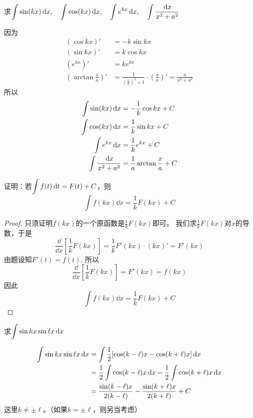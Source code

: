 \begin{example}
求$\displaystyle\int \sin (kx)\,{\rm d} x,\quad \displaystyle\int \cos(kx)\,{\rm d} x,\quad \displaystyle\int e^{kx}\,{\rm d} x,\quad \displaystyle\int \dfrac{\,{\rm d} x}{x^2+a^2}$
\end{example}

\begin{solution}
    因为
\[\begin{split}
    (\cos kx)'&=-k\sin kx\\
    (\sin kx)'&=k\cos kx\\
    (e^{kx})'&=ke^{kx}\\
    \left(\arctan\frac{x}{a}\right)'&=\frac{1}{\left(\frac{x}{a}\right)^2+1}\cdot\left(\frac{x}{a}\right)'=\frac{a}{x^2+a^2}
\end{split}\]
所以
\[\begin{split}
    \int \sin (kx)\,{\rm d} x&=-\dfrac{1}{k}\cos kx+C\\
    \displaystyle\int \cos(kx)\,{\rm d} x&=\dfrac{1}{k}\sin kx+C\\
    \displaystyle\int e^{kx}\,{\rm d} x&= \dfrac{1}{k}e^{kx}+C\\
    \displaystyle\int \dfrac{\,{\rm d} x}{x^2+a^2}&=\dfrac{1}{a}\arctan\dfrac{x}{a}+C \\
\end{split}  \]
\end{solution}

\begin{example}
    证明：若$\displaystyle\int f(t)\,{\rm d} t=F(t)+C$，则
\[\int f(kx)\dd x=\frac{1}{k}F(kx)+C\]
\end{example}

\begin{proof}
只须证明$f(kx)$的一个原函数是$\frac{1}{k}F(kx)$即可。
我们求$\frac{1}{k}F(kx)$对$x$的导数，于是
\[\frac{\dd}{\dd x}\left[\frac{1}{k}F(kx)\right]=\frac{1}{k}F'(kx)\cdot (kx)'=F'(kx)\]
由题设知$F' (t) =f (t)$, 所以
\[\frac{\dd}{\dd x}\left[\frac{1}{k}F(kx)\right]=F'(kx)=f(kx)\]
因此
\[\int f (kx) \dd x=\frac{1}{k}F (kx) +C\]
\end{proof}

\begin{example}
求$\displaystyle\int \sin kx\sin\ell x\,{\rm d} x$
\end{example}

\begin{solution}
\[\begin{split}
    \displaystyle\int \sin kx\sin\ell x\,{\rm d} x&=\int \dfrac{1}{2}[\cos(k-\ell)x-\cos(k+\ell)x]\,{\rm d} x\\
    &=\dfrac{1}{2}\int \cos (k-\ell)x\,{\rm d} x-\dfrac{1}{2}\int \cos (k+\ell)x\,{\rm d} x\\
&=\dfrac{\sin(k-\ell)x}{2(k-\ell)}-\dfrac{\sin(k+\ell)x}{2(k+\ell)}+C
\end{split}\]
    这里$k\ne \pm \ell$。（如果$k=\pm\ell$，则另当考虑）
\end{solution}


